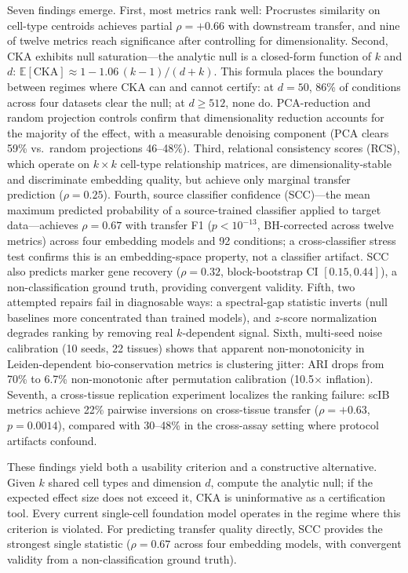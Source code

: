 \documentclass[11pt]{article}
\begin{document}
Seven findings emerge. First, most metrics rank well: Procrustes
similarity on cell-type centroids achieves partial $\rho = +0.66$ with
downstream transfer, and nine of twelve metrics reach significance after
controlling for dimensionality. Second, CKA exhibits null saturation---the
analytic null is a closed-form function of $k$ and $d$:
$\mathbb{E}[\mathrm{CKA}] \approx 1 - 1.06\,(k{-}1)/(d{+}k)$. This
formula places the boundary between regimes where CKA can and cannot
certify: at $d = 50$, 86\% of conditions across four datasets clear the
null; at $d \geq 512$, none do. PCA-reduction and random projection
controls confirm that dimensionality reduction accounts for the majority
of the effect, with a measurable denoising component (PCA clears 59\%
vs.\ random projections 46--48\%). Third, relational consistency scores
(RCS), which operate on $k \times k$ cell-type relationship matrices,
are dimensionality-stable and discriminate embedding quality, but
achieve only marginal transfer prediction ($\rho = 0.25$). Fourth,
source classifier confidence (SCC)---the mean maximum predicted
probability of a source-trained classifier applied to target
data---achieves $\rho = 0.67$ with transfer F1 ($p < 10^{-13}$,
BH-corrected across twelve metrics) across four embedding models and
92 conditions; a cross-classifier stress test confirms this is an
embedding-space property, not a classifier artifact. SCC also predicts
marker gene recovery ($\rho = 0.32$, block-bootstrap CI
$[0.15, 0.44]$), a non-classification ground truth, providing
convergent validity. Fifth, two attempted
repairs fail in diagnosable ways: a spectral-gap statistic inverts
(null baselines more concentrated than trained models),
and $z$-score normalization degrades ranking by removing real
$k$-dependent signal. Sixth, multi-seed noise calibration (10 seeds, 22
tissues) shows that apparent non-monotonicity in Leiden-dependent
bio-conservation metrics is clustering jitter: ARI drops from 70\% to
6.7\% non-monotonic after permutation calibration (10.5$\times$
inflation). Seventh, a cross-tissue replication experiment localizes the
ranking failure: scIB metrics achieve 22\% pairwise inversions on
cross-tissue transfer ($\rho = +0.63$, $p = 0.0014$), compared with
30--48\% in the cross-assay setting where protocol artifacts confound.

These findings yield both a usability criterion and a constructive
alternative. Given $k$ shared cell types and dimension $d$, compute the
analytic null; if the expected effect size does not exceed it, CKA is
uninformative as a certification tool. Every current single-cell
foundation model operates in the regime where this criterion is
violated. For predicting transfer quality directly, SCC provides the
strongest single statistic ($\rho = 0.67$ across four embedding
models, with convergent validity from a non-classification ground
truth).
\end{document}
